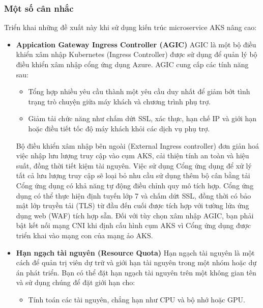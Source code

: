 \subsubsection{Một số cân nhắc}
Triển khai những đề xuất này khi sử dụng kiến trúc microservice AKS nâng cao:
    \begin{itemize}
        \item \textbf{Appication Gateway Ingress Controller (AGIC)} 
            \newline
            AGIC là một bộ điều khiển xâm nhập Kubernetes (Ingress Controller) được sử dụng để quản lý bộ điều khiển xâm nhập cổng ứng dụng Azure. AGIC cung cấp các tính năng sau:
            \begin{itemize}
                \item Tổng hợp nhiều yêu cầu thành một yêu cầu duy nhất để giảm bớt tình trạng trò chuyện giữa máy khách và chương trình phụ trợ.
                \item Giảm tải chức năng như chấm dứt SSL, xác thực, hạn chế IP và giới hạn hoặc điều tiết tốc độ máy khách khỏi các dịch vụ phụ trợ.
            \end{itemize}
            Bộ điều khiển xâm nhập bên ngoài (External Ingress controller) đơn giản hoá việc nhập lưu lượng truy cập vào cụm AKS, cải thiện tính an toàn và hiệu suất, đồng thời tiết kiệm tài nguyên. Việc sử dụng Cổng ứng dụng để xử lý tất cả lưu lượng truy cập sẽ loại bỏ nhu cầu sử dụng thêm bộ cân bằng tải
            \newline
            Cổng ứng dụng có khả năng tự động điều chỉnh quy mô tích hợp. Cổng ứng dụng có thể thực hiện định tuyến lớp 7 và chấm dứt SSL, đồng thời có bảo mật lớp truyền tải (TLS) từ đầu đến cuối được tích hợp với tường lửa ứng dụng web (WAF) tích hợp sẵn.
            \newline
            Đối với tùy chọn xâm nhập AGIC, bạn phải bật kết nối mạng CNI khi định cấu hình cụm AKS vì Cổng ứng dụng được triển khai vào mạng con của mạng ảo AKS.
        \item \textbf{Hạn ngạch tài nguyên (Resource Quota)}
            \newline 
            Hạn ngạch tài nguyên là một cách để quản trị viên dự trữ và giới hạn tài nguyên trong một nhóm hoặc dự án phát triển. Bạn có thể đặt hạn ngạch tài nguyên trên một không gian tên và sử dụng chúng để đặt giới hạn cho:
            \begin{itemize}
                \item Tính toán các tài nguyên, chẳng hạn như CPU và bộ nhớ hoặc GPU.

\end{itemize}
\end{itemize}
